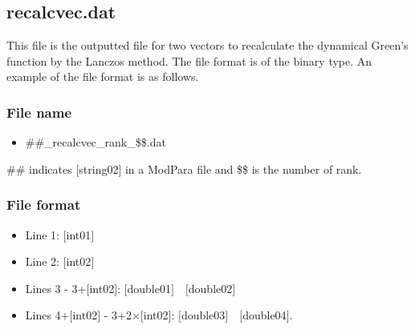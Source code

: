 \newpage
\subsection{{recalcvec.dat}}
This file is the outputted file for two vectors to recalculate the dynamical Green's function by the Lanczos method. 
The file format is of the binary type.  An example of the file format is as follows.

\subsubsection{File name}
\begin{itemize}
   \item{\#\#\_recalcvec\_rank\_\$\$.dat}
\end{itemize}
\#\# indicates [string02] in a ModPara file and \$\$ is the number of rank. 

\subsubsection{File format}
 \begin{itemize}
   \item  Line 1: $[$int01$]$
   \item  Line 2: $[$int02$]$
   \item  Lines 3 - 3+$[$int02$]$: $[$double01$]$~~$[$double02$]$
   \item  Lines 4+$[$int02$]$ - 3+2$\times [$int02$]$: $[$double03$]$~~$[$double04$]$.

  \end{itemize}
